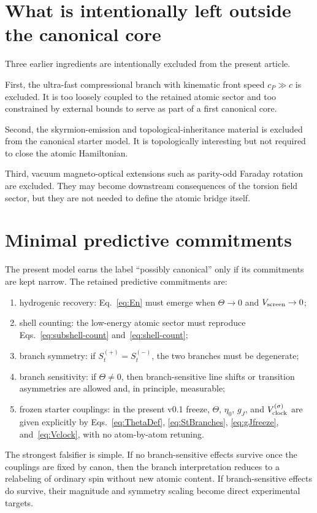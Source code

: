 \documentclass[11pt,a4paper]{article}
\begin{document}
\section{What is intentionally left outside the canonical core}
Three earlier ingredients are intentionally excluded from the present article.

First, the ultra-fast compressional branch with kinematic front speed $c_P\gg c$ is excluded. It is too loosely coupled to the retained atomic sector and too constrained by external bounds to serve as part of a first canonical core.

Second, the skyrmion-emission and topological-inheritance material is excluded from the canonical starter model. It is topologically interesting but not required to close the atomic Hamiltonian.

Third, vacuum magneto-optical extensions such as parity-odd Faraday rotation are excluded. They may become downstream consequences of the torsion field sector, but they are not needed to define the atomic bridge itself.

\section{Minimal predictive commitments}
The present model earns the label ``possibly canonical'' only if its commitments are kept narrow. The retained predictive commitments are:
\begin{enumerate}[label=(P\arabic*)]
    \item hydrogenic recovery: Eq.~\eqref{eq:En} must emerge when $\Theta\to 0$ and $V_{\rm screen}\to 0$;
    \item shell counting: the low-energy atomic sector must reproduce Eqs.~\eqref{eq:subshell-count} and~\eqref{eq:shell-count};
    \item branch symmetry: if $S_t^{(+)}=S_t^{(-)}$, the two branches must be degenerate;
    \item branch sensitivity: if $\Theta\neq 0$, then branch-sensitive line shifts or transition asymmetries are allowed and, in principle, measurable;
    \item frozen starter couplings: in the present v0.1 freeze, $\Theta$, $\eta_0$, $g_J$, and $V_{\rm clock}^{(\sigma)}$ are given explicitly by Eqs.~\eqref{eq:ThetaDef}, \eqref{eq:StBranches}, \eqref{eq:gJfreeze}, and~\eqref{eq:Vclock}, with no atom-by-atom retuning.
\end{enumerate}

The strongest falsifier is simple. If no branch-sensitive effects survive once the couplings are fixed by canon, then the branch interpretation reduces to a relabeling of ordinary spin without new atomic content. If branch-sensitive effects do survive, their magnitude and symmetry scaling become direct experimental targets.
\end{document}
